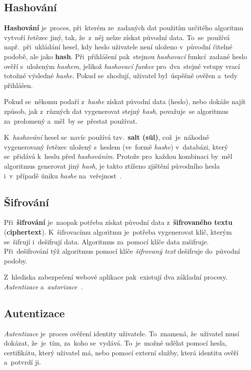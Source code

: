 \documentclass[11pt,a4paper]{report}
\begin{document}
            \subsection{Hashování}
                \textbf{Hashování} je~proces, při~kterém ze~zadaných dat použitím určitého algoritmu vytvoří řetězec jiný, tak, že~z~něj nelze získat původní data. To~se~používá např.~při~ukládání hesel, kdy heslo uživatele není uloženo v~původní čitelné podobě, ale jako \textbf{hash}. Při~přihlášení pak~stejnou \emph{hashovací} funkcí~zadané heslo ověří s~uloženým \emph{hashem}, jelikož \emph{hashovací funkce} pro~dva~stejné vstupy vrací totožné výsledné \emph{hashe}. Pokud se~shodují, uživatel byl~úspěšně ověřen a~tedy přihlášen.
                
                Pokud se~někomu podaří z~\emph{hashe} získat původní data (heslo), nebo dokáže najít způsob, jak z~různých dat vygenerovat stejný \emph{hash}, považuje~se algoritmus za~prolomený a~měl~by se~přestat používat.
                
                K~\emph{hashování} hesel se~navíc používá tzv.~\textbf{salt (sůl)}, což~je~náhodně vygenerovaný řetězec uložený s~heslem (ve~formě \emph{hashe}) v~databázi, který se~přidává k~heslu před \emph{hashováním}. Protože pro~každou kombinaci by~měl algoritmus generovat jiný \emph{hash}, je takto ztíženo zjištění původního hesla i~v~případě úniku \emph{hashe} na~veřejnost~\cite{graham2021ethical}.
        
            \subsection{Šifrování}
                Při~\textbf{šifrování} je~naopak potřeba získat původní data z~\textbf{šifrovaného textu} (\textbf{ciphertext}). K~šifrovacímu algoritmu je~potřeba vygenerovat klíč, kterým se~šifrují i~dešifrují data. Algoritmus za~pomocí klíče data zašifruje. Při~dešifrování týž algoritmus pomocí klíče \emph{šifrovaný text} dešifruje do~původní podoby.

                Z~hlediska zabezpečení webové aplikace pak~existují dva základní procesy. \emph{Autentizace} a~\emph{autorizace}~\cite{graham2021ethical}.

            \subsection{Autentizace}
                \emph{Autentizace} je~proces ověření identity uživatele. To~znamená, že~uživatel musí dokázat, že~je~tím, za~koho se~vydává. To~je~možné udělat pomocí hesla, certifikátu, který uživatel má, nebo pomocí externí služby, která identitu ověří a~potvrdí ji.
                
\end{document}
